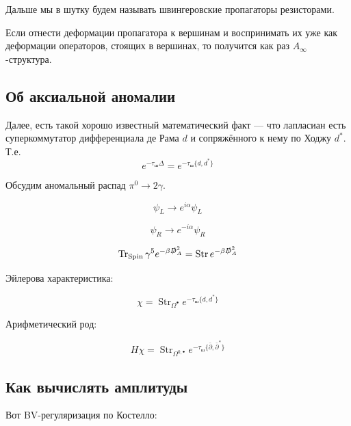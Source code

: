 \documentclass[11pt]{article}
\def\p{\partial}
\theoremstyle{remark}
\theoremstyle{definition}
\begin{document}
Дальше мы в шутку будем называть швингеровские пропагаторы резисторами.

Если отнести деформации пропагатора к вершинам и воспринимать их уже как деформации операторов, стоящих в вершинах, то получится как раз $A_{\infty}$-структура.


\subsection{Об аксиальной аномалии}


Далее, есть такой хорошо известный математический факт --- что лапласиан есть суперкоммутатор дифференциала де Рама $d$ и сопряжённого к нему по Ходжу $d^*$. Т.е. $$e^{-\tau_{\text{ш}} \Delta} = e^{-\tau_{\text{ш}} \{ d, d^* \} }$$

Обсудим аномальный распад $\pi^0 \to 2\gamma$.

$$\psi_L \to e^{i\alpha} \psi_L $$

$$\psi_R \to e^{-i\alpha} \psi_R $$

$$\operatorname{Tr}_{\text{Spin}} \gamma^5 e^{-\beta \slashed{D}^2_A} = \operatorname{Str} e^{-\beta \slashed{D}^2_A}$$

Эйлерова характеристика:

$$\chi = \operatorname{Str}_{\Omega^{\bullet}} e^{-\tau_{\text{ш}} \{ d, d^* \}  } $$

Арифметический род:

$$H\chi = \operatorname{Str}_{\Omega^{0,\bullet}} e^{-\tau_{\text{ш}} \{ \bar \p, \bar \p^* \}  } $$

\subsection{Как вычислять амплитуды}

Вот BV-регуляризация по Костелло:

\begin{center}
\end{center}
\end{document}
